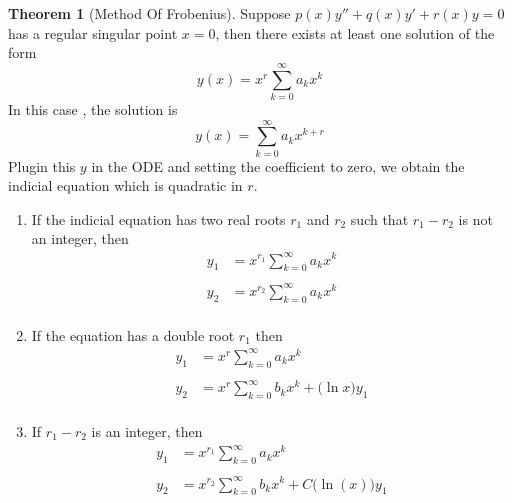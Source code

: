 \documentclass[11pt,a4paper]{article}
\theoremstyle{definition}
\newtheorem{thm}{Theorem}[subsection]
\begin{document}
\begin{thm}[Method Of Frobenius]


Suppose $p(x)y'' + q(x)y' + r(x)y = 0$ has a regular singular point $x =0$, then there exists at least one solution of the form $$y(x) = x^r \sum^{\infty} _{k = 0} a_k x^k$$ 
In this case , the solution is $$y(x) = \sum^{\infty}_{k=0} a_k x^{k+r}$$
Plugin this $y$ in the ODE and setting the coefficient to zero, we obtain the indicial equation which is quadratic in $r$.


\begin{enumerate}
\item If the indicial equation has two real roots $r_1$ and $r_2$ such that $r_1 -r_2$ is not an integer, then 
\begin{align*}
y_1 & = x^{r_1} \sum^{\infty}_{k = 0} a_k x^k\\\\
y_2 & = x^{r_2} \sum^{\infty}_{k=0} a_k x^k\\
\end{align*}

\item If  the equation has a double root $r_1$ then 
\begin{align*}
y_1 & = x^r \sum^{\infty}_{k = 0} a_k x^k\\\\
y_2 & = x^r \sum^{\infty}_{k = 0} b_kx^k + \big(\ln x\big) y_1\\
\end{align*}

\item If $r_1 -r_2$ is an  integer, then 
\begin{align*}
y_1 & = x^{r_1} \sum^{\infty}_{k = 0} a_k x^k\\\\
y_2 & = x^{r_2} \sum^{\infty}_{k=0} b_kx^k + C\big(\ln (x)\big) y_1\\
\end{align*}
\end{enumerate}
\end{thm}
\end{document}

